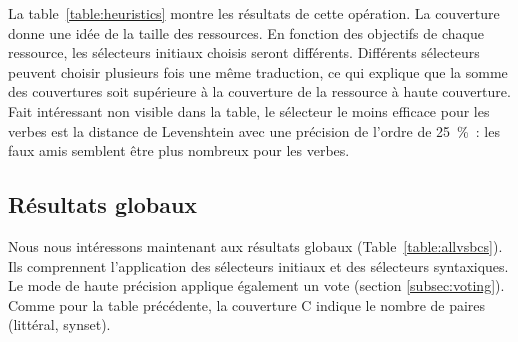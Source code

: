 La table~\ref{table:heuristics} montre les résultats de cette opération. La couverture donne une idée de la taille des ressources. En fonction des objectifs de chaque ressource, les sélecteurs initiaux choisis seront différents. Différents sélecteurs peuvent choisir plusieurs fois une même traduction, ce qui explique que la somme des couvertures soit supérieure à la couverture de la ressource à haute couverture. Fait intéressant non visible dans la table, le sélecteur le moins efficace pour les verbes est la distance de Levenshtein avec une précision de l'ordre de 25~\%~: les faux amis semblent être plus nombreux pour les verbes.


\subsection{Résultats globaux}
\label{subsec:allvsbcs}

Nous nous intéressons maintenant aux résultats globaux (Table~\ref{table:allvsbcs}). Ils comprennent l'application des sélecteurs initiaux et des sélecteurs syntaxiques. Le mode de haute précision applique également un vote (section \ref{subsec:voting}). Comme pour la table précédente, la couverture C indique le nombre de paires (littéral, synset).

